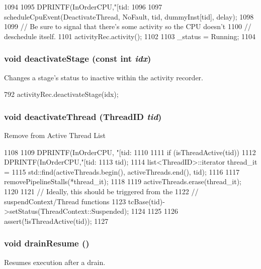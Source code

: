 \begin{DoxyCode}
1094 {
1095     DPRINTF(InOrderCPU,"[tid:%
1096 
1097     scheduleCpuEvent(DeactivateThread, NoFault, tid, dummyInst[tid], delay);
1098 
1099     // Be sure to signal that there's some activity so the CPU doesn't
1100     // deschedule itself.
1101     activityRec.activity();
1102 
1103     _status = Running;
1104 }
\end{DoxyCode}
\hypertarget{classInOrderCPU_a4d73bea02eaf6f93e267391592556fe7}{
\subsubsection[{deactivateStage}]{\setlength{\rightskip}{0pt plus 5cm}void deactivateStage (const int {\em idx})}}
\label{classInOrderCPU_a4d73bea02eaf6f93e267391592556fe7}
Changes a stage's status to inactive within the activity recorder. 


\begin{DoxyCode}
792     { activityRec.deactivateStage(idx); }
\end{DoxyCode}
\hypertarget{classInOrderCPU_ad11d9216ad92d9036ebf37844cf6e706}{
\subsubsection[{deactivateThread}]{\setlength{\rightskip}{0pt plus 5cm}void deactivateThread ({\bf ThreadID} {\em tid})}}
\label{classInOrderCPU_ad11d9216ad92d9036ebf37844cf6e706}
Remove from Active Thread List 


\begin{DoxyCode}
1108 {
1109     DPRINTF(InOrderCPU, "[tid:%
1110 
1111     if (isThreadActive(tid)) {
1112         DPRINTF(InOrderCPU,"[tid:%
1113                 tid);
1114         list<ThreadID>::iterator thread_it =
1115             std::find(activeThreads.begin(), activeThreads.end(), tid);
1116 
1117         removePipelineStalls(*thread_it);
1118 
1119         activeThreads.erase(thread_it);
1120 
1121         // Ideally, this should be triggered from the
1122         // suspendContext/Thread functions
1123         tcBase(tid)->setStatus(ThreadContext::Suspended);    
1124     }
1125 
1126     assert(!isThreadActive(tid));    
1127 }
\end{DoxyCode}
\hypertarget{classInOrderCPU_a8f020d3237536fe007fc488c4125c5d8}{
\subsubsection[{drainResume}]{\setlength{\rightskip}{0pt plus 5cm}void drainResume ()}}
\label{classInOrderCPU_a8f020d3237536fe007fc488c4125c5d8}
Resumes execution after a drain. 


